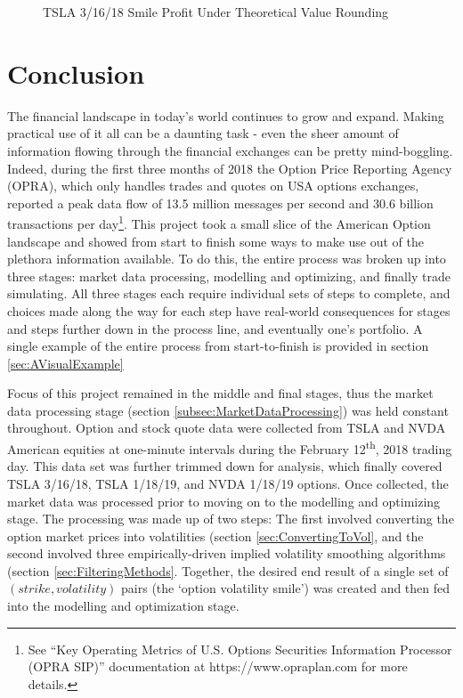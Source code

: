 \documentclass[12pt, a4paper, notitlepage]{article}
\numberwithin{equation}{subsection}
\numberwithin{figure}{subsection}
\numberwithin{table}{subsection}
\newcommand{\img}[3]
{
    \begin{figure}[H]
	\caption{#1}
	\centerline{\fbox{\texttt{[image: \#2]}}}
	\label{#3}
    \end{figure}
}
\newcommand{\newpar}{\newline \newline}
\begin{document}
\img{TSLA 3/16/18 Smile Profit Under Theoretical Value Rounding}{TSLA_Mar_SmileRounding}{fig:SmileRounding}

\label{subsec:ANoteOnRounding}

\newpage
\section{Conclusion} \label{sec:DiscussionAndConclusion}
The financial landscape in today's world continues to grow and expand.  Making practical use of it all can be a daunting task - even the sheer amount of information flowing through the financial exchanges can be pretty mind-boggling.  Indeed, during the first three months of 2018 the Option Price Reporting Agency (OPRA), which only handles trades and quotes on USA options exchanges, reported a peak data flow of 13.5 million messages per second and 30.6 billion transactions per day\footnote{See ``Key Operating Metrics of U.S. Options Securities Information Processor (OPRA SIP)'' documentation at https://www.opraplan.com for more details.}.
\newpar
This project took a small slice of the American Option landscape and showed from start to finish some ways to make use out of the plethora information available.  To do this, the entire process was broken up into three stages:  market data processing, modelling and optimizing, and finally trade simulating.  All three stages each require individual sets of steps to complete, and choices made along the way for each step have real-world consequences for stages and steps further down in the process line, and eventually one's portfolio.  A single example of the entire process from start-to-finish is provided in section \ref{sec:AVisualExample}

Focus of this project remained in the middle and final stages, thus the market data processing stage (section \ref{subsec:MarketDataProcessing}) was held constant throughout.  Option and stock quote data were collected from TSLA and NVDA American equities at one-minute intervals during the February 12\textsuperscript{th}, 2018 trading day.  This data set was further trimmed down for analysis, which finally covered TSLA 3/16/18, TSLA 1/18/19, and NVDA 1/18/19 options.
\newpar
Once collected, the market data was processed prior to moving on to the modelling and optimizing stage.  The processing was made up of two steps:  The first involved converting the option market prices into volatilities (section \ref{sec:ConvertingToVol}, and the second involved three empirically-driven implied volatility smoothing algorithms (section \ref{sec:FilteringMethods}.  Together, the desired end result of a single set of $(strike, volatility)$ pairs (the `option volatility smile') was created and then fed into the modelling and optimization stage.
\end{document}
